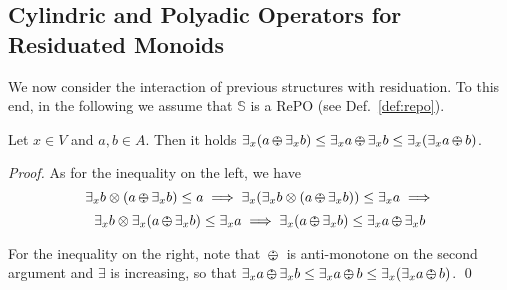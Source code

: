 \documentclass{llncs}
\def\odiv{\, {\ominus\hspace{-7.7pt} \div} \,}
\begin{document}


\subsection{Cylindric and Polyadic Operators for Residuated Monoids}
\label{cyre}
We now consider 
the interaction of previous structures with residuation. 
%
To this end, in the following we assume that 
$\mathbb{S}$ is a RePO (see Def.~\ref{def:repo}).


\begin{lemma}
\label{divex}
Let $x \in V$ and $a, b \in A$.
Then it holds
         $\exists_x(a \odiv \exists_x b) \leq \exists_x a \odiv \exists_x b \leq
                                               \exists_x(\exists_x a \odiv b)$.
\end{lemma}

\begin{proof}
As for the inequality on the left, we have
 \[\exists_x b \otimes (a \odiv \exists_x b) \leq a \implies
   \exists_x(\exists_x b \otimes (a \odiv \exists_x b)) \leq \exists_x a \implies\]
 \[\exists_x b \otimes \exists_x(a \odiv \exists_x b) \leq \exists_x a \implies
   \exists_x(a \odiv \exists_x b) \leq \exists_x a \odiv \exists_x b\]

For the inequality on the right, note that $\odiv$ is anti-monotone on the second argument and $\exists$ 
is increasing, so that $\exists_x a \odiv \exists_x b \leq \exists_x a \odiv b \leq \exists_x (\exists_x a \odiv b)$.
\qed
\end{proof}
\end{document}
